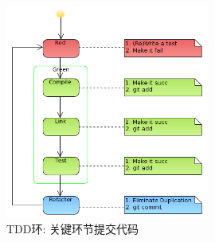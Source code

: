 \begin{content}
\begin{story}
\begin{content}
\begin{figure}[H]
\centering
\includegraphics[width=0.6\textwidth]{figures/xunit/tdd-git.png}
\caption{TDD环: 关键环节提交代码}
 \label{fig:tdd-git}
\end{figure}

\end{content}

\end{story}

\end{content}

